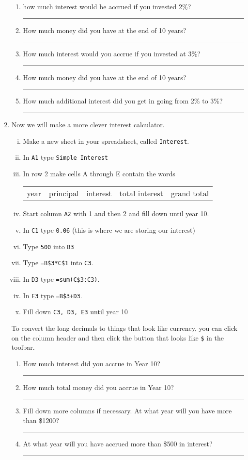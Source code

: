 \documentclass[12pt]{article}
\newcommand{\ans}[1][1in]{\rule{#1}{.5pt}}
\newcommand{\be}{\begin{enumerate}}
\newcommand{\ee}{\end{enumerate}}
\begin{document}
\begin{enumerate}
\doublespacing

\be
\item how much interest would be accrued if you invested 2\%? \ans

\item How much money did you have at the end of 10 years? \ans

\item How much interest would you accrue if you invested at 3\%? \ans

\item How much money did you have at the end of 10 years? \ans

\item How much additional interest did you get in going from 2\% to 3\%? \ans

\ee

\newpage

\singlespacing
\item Now we will make a more clever interest calculator. 

\be[i.]
\item Make a new sheet in your spreadsheet, called \verb`Interest`.
\item In \verb`A1` type \verb`Simple Interest`
\item In row 2 make cells A through E contain the words 

\begin{tabular}{c c c c c}
year&principal&	interest&	total interest&	grand total\\
\end{tabular}
\item Start column \verb`A2` with 1 and then 2 and fill down until year 10.
\item In \verb `C1` type \verb`0.06` (this is where we are storing our interest)
\item Type \verb`500` into \verb`B3`
\item Type \verb`=B$3*C$1` into \verb`C3`. 
\item In \verb`D3` type \verb`=sum(C$3:C3)`. 
\item In \verb`E3` type \verb`=B$3+D3`.
\item Fill down \verb`C3, D3, E3` until year 10
\ee

 To convert the long decimals to things that look like currency, you can click on the column header and then click the button that looks like \verb`$` in the toolbar.

\doublespacing

\be
\item How much interest did you accrue in Year 10? \ans
\item How much total money did you accrue in Year 10? \ans
\item Fill down more columns if necessary. At what year will you have more than \$1200? \ans
\item At what year will you have accrued more than \$500 in interest? \ans
\ee




\end{enumerate}
\end{document}
